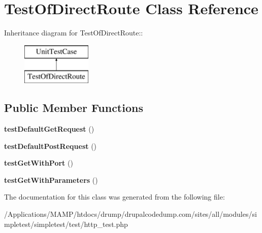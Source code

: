 \hypertarget{class_test_of_direct_route}{
\section{TestOfDirectRoute Class Reference}
\label{class_test_of_direct_route}
}
Inheritance diagram for TestOfDirectRoute::\begin{figure}[H]
\begin{center}
\leavevmode
\includegraphics[height=2cm]{class_test_of_direct_route}
\end{center}
\end{figure}
\subsection*{Public Member Functions}
\begin{DoxyCompactItemize}
\item 
\hypertarget{class_test_of_direct_route_abbf2b4b95187763e0ec9d66adfe17061}{
{\bfseries testDefaultGetRequest} ()}
\label{class_test_of_direct_route_abbf2b4b95187763e0ec9d66adfe17061}

\item 
\hypertarget{class_test_of_direct_route_a4dbb6d3f1fb4aeb4aa3153d9dbb5af72}{
{\bfseries testDefaultPostRequest} ()}
\label{class_test_of_direct_route_a4dbb6d3f1fb4aeb4aa3153d9dbb5af72}

\item 
\hypertarget{class_test_of_direct_route_a92b516bf5e9361fa2483bbaa13ae0a72}{
{\bfseries testGetWithPort} ()}
\label{class_test_of_direct_route_a92b516bf5e9361fa2483bbaa13ae0a72}

\item 
\hypertarget{class_test_of_direct_route_a71b64f46e964155fdeaf88d416f1179c}{
{\bfseries testGetWithParameters} ()}
\label{class_test_of_direct_route_a71b64f46e964155fdeaf88d416f1179c}

\end{DoxyCompactItemize}


The documentation for this class was generated from the following file:\begin{DoxyCompactItemize}
\item 
/Applications/MAMP/htdocs/drump/drupalcodedump.com/sites/all/modules/simpletest/simpletest/test/http\_\-test.php\end{DoxyCompactItemize}
